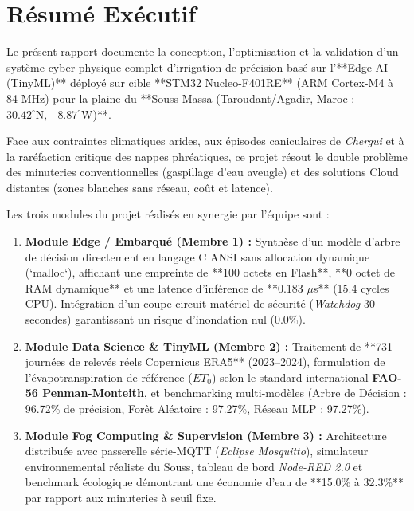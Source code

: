 \documentclass[11pt,a4paper]{report}
\begin{document}
\chapter*{Résumé Exécutif}

Le présent rapport documente la conception, l'optimisation et la validation d'un système cyber-physique complet d'irrigation de précision basé sur l'**Edge AI (TinyML)** déployé sur cible **STM32 Nucleo-F401RE** (ARM Cortex-M4 à 84 MHz) pour la plaine du **Souss-Massa (Taroudant/Agadir, Maroc : $30.42^\circ\text{N}, -8.87^\circ\text{W}$)**.

Face aux contraintes climatiques arides, aux épisodes caniculaires de \textit{Chergui} et à la raréfaction critique des nappes phréatiques, ce projet résout le double problème des minuteries conventionnelles (gaspillage d'eau aveugle) et des solutions Cloud distantes (zones blanches sans réseau, coût et latence).

Les trois modules du projet réalisés en synergie par l'équipe sont :
\begin{enumerate}
    \item \textbf{Module Edge / Embarqué (Membre 1) :} Synthèse d'un modèle d'arbre de décision directement en langage C ANSI sans allocation dynamique (`malloc`), affichant une empreinte de **100 octets en Flash**, **0 octet de RAM dynamique** et une latence d'inférence de **0.183 $\mu$s** (15.4 cycles CPU). Intégration d'un coupe-circuit matériel de sécurité (\textit{Watchdog} 30 secondes) garantissant un risque d'inondation nul (0.0\%).
    \item \textbf{Module Data Science \& TinyML (Membre 2) :} Traitement de **731 journées de relevés réels Copernicus ERA5** (2023--2024), formulation de l'évapotranspiration de référence ($ET_0$) selon le standard international \textbf{FAO-56 Penman-Monteith}, et benchmarking multi-modèles (Arbre de Décision : 96.72\% de précision, Forêt Aléatoire : 97.27\%, Réseau MLP : 97.27\%).
    \item \textbf{Module Fog Computing \& Supervision (Membre 3) :} Architecture distribuée avec passerelle série-MQTT (\textit{Eclipse Mosquitto}), simulateur environnemental réaliste du Souss, tableau de bord \textit{Node-RED 2.0} et benchmark écologique démontrant une économie d'eau de **15.0\% à 32.3\%** par rapport aux minuteries à seuil fixe.
\end{enumerate}

\vspace{0.5cm}
\end{document}

